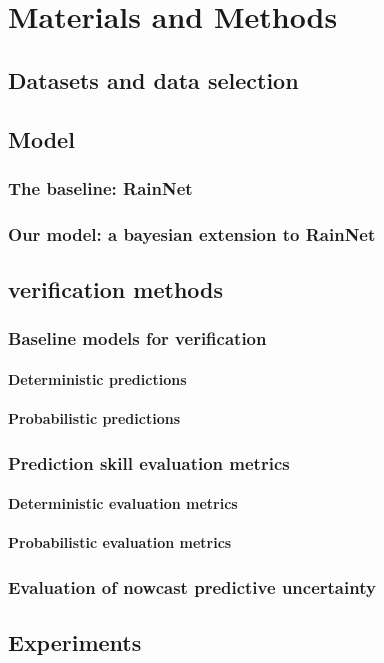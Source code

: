 \chapter{Materials and Methods}
\label{chapter:methods}


\section{Datasets and data selection}

\section{Model}

\subsection{The baseline: RainNet}
\subsection{Our model: a bayesian extension to RainNet}

\section{verification methods}

\subsection{Baseline models for verification}
\subsubsection{Deterministic predictions}
\subsubsection{Probabilistic predictions}
\subsection{Prediction skill evaluation metrics}
\subsubsection{Deterministic evaluation metrics}
\subsubsection{Probabilistic evaluation metrics}

\subsection{Evaluation of nowcast predictive uncertainty}


\section{Experiments}
